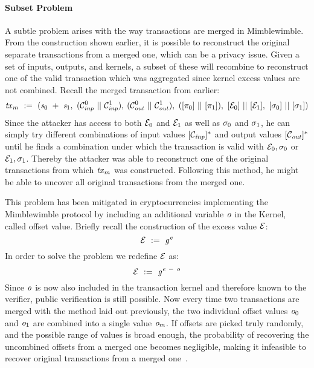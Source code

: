 \paragraph{Subset Problem} \label{par:pre:mimblewimble:subset}
A subtle problem arises with the way transactions are merged in Mimblewimble.
From the construction shown earlier, it is possible to reconstruct the original separate transactions from a merged one, which can be a privacy issue.
Given a set of inputs, outputs, and kernels, a subset of these will recombine to reconstruct one of the valid transaction which was aggregated since kernel excess values are not combined.
Recall the merged transaction from earlier:
\[ \mathit{tx}_m ~:=~ (\mathit{s}_0 ~+~ \mathit{s}_1 ,~ (\mathcal{C}_{\mathit{inp}}^0 ~||~ \mathcal{C}_{\mathit{inp}}^1),\:(\mathcal{C}_{\mathit{out}}^0 ~||~ \mathcal{C}_{\mathit{out}}^1) ,~ ([\pi_0] ~||~ [\pi_1]) ,~
[\mathcal{E}_0] ~||~ [\mathcal{E}_1] ,~ [\sigma_0] ~||~ [\sigma_1]) \]
Since the attacker has access to both $\mathcal{E}_0$ and $\mathcal{E}_1$ as well as $\sigma_0$ and $\sigma_1$, he can simply try different combinations of input values $[\mathcal{C}_{\mathit{inp}}]^*$ and output values $[\mathcal{C}_{\mathit{out}}]^*$ until he finds a combination under which the transaction is valid with $\mathcal{E}_0, \sigma_0$ or $\mathcal{E}_1, \sigma_1$.
Thereby the attacker was able to reconstruct one of the original transactions from which $\mathit{tx}_m$ was constructed.
Following this method, he might be able to uncover all original transactions from the merged one.

This problem has been mitigated in cryptocurrencies implementing the Mimblewimble protocol by including an additional variable $\mathit{o}$ in the Kernel, called offset value.
Briefly recall the construction of the excess value $\mathcal{E}$:
\[ \mathcal{E} ~:=~ \mathit{g}^{\mathit{e}} \]
In order to solve the problem we redefine $\mathcal{E}$ as:
\[ \mathcal{E} ~:=~ \mathit{g}^{\mathit{e} ~-~ \mathit{o}} \]
Since $\mathit{o}$ is now also included in the transaction kernel and therefore known to the verifier, public verification is still possible.
Now every time two transactions are merged with the method laid out previously, the two individual offset values $\mathit{o}_0$ and $\mathit{o}_1$ are combined into a single value $\mathit{o}_m$.
If offsets are picked truly randomly, and the possible range of values is broad enough, the probability of recovering the uncombined offsets from a merged one becomes negligible, making it infeasible to recover original transactions from a merged one~\cite{poelstra2016mimblewimble}.



